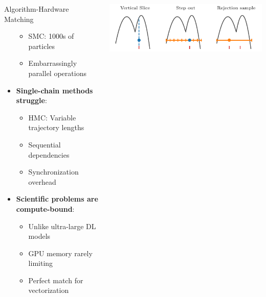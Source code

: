 \documentclass[aspectratio=169]{beamer}
\begin{document}
\begin{frame}
\begin{columns}
\begin{block}{Algorithm-Hardware Matching}
\begin{itemize}
\begin{itemize}
                        \item SMC: 1000s of particles
                        \item Embarrassingly parallel operations
                    \end{itemize}
                \item \textbf{Single-chain methods struggle}:
                    \begin{itemize}
                        \item HMC: Variable trajectory lengths
                        \item Sequential dependencies
                        \item Synchronization overhead
                    \end{itemize}
                \item \textbf{Scientific problems are compute-bound}:
                    \begin{itemize}
                        \item Unlike ultra-large DL models
                        \item GPU memory rarely limiting
                        \item Perfect match for vectorization
                    \end{itemize}
            \end{itemize}
        \end{block}
        \vspace{5pt}
        \includegraphics[width=\textwidth]{figures/slice_sampling_diagram}
    \end{columns}
\end{frame}
\end{document}

